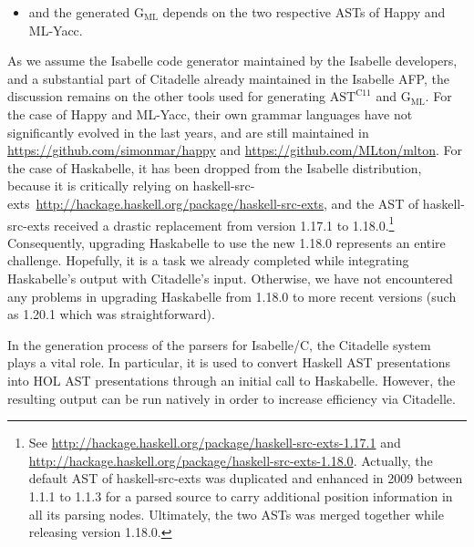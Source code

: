 \begin{isabellebody}
\begin{isamarkuptext}
\begin{itemize}
\item and the generated $\text{G}_{\text{ML}}$ depends on the two respective ASTs of Happy and
ML-Yacc.%
\end{itemize}%
\end{isamarkuptext}\isamarkuptrue%
%
\begin{isamarkuptext}%
As we assume the Isabelle code generator maintained by the Isabelle developers, and a
substantial part of Citadelle already maintained in the Isabelle AFP, the discussion remains on the
other tools used for generating $\text{AST}^{\text{C11}}$ and $\text{G}_{\text{ML}}$. For the case
of Happy and ML-Yacc, their own grammar languages have not significantly evolved in the last years,
and are still maintained in \url{https://github.com/simonmar/happy} and
\url{https://github.com/MLton/mlton}. For the case of Haskabelle, it has been
dropped from the Isabelle distribution, because it is critically relying on
haskell-src-exts~\url{http://hackage.haskell.org/package/haskell-src-exts}, and the
AST of haskell-src-exts received a drastic replacement from version 1.17.1 to 1.18.0.\footnote{See \url{http://hackage.haskell.org/package/haskell-src-exts-1.17.1} and
  \url{http://hackage.haskell.org/package/haskell-src-exts-1.18.0}. Actually, the
  default AST of haskell-src-exts was duplicated and enhanced in 2009 between 1.1.1 to 1.1.3 for a
  parsed source to carry additional position information in all its parsing nodes. Ultimately, the
  two ASTs was merged together while releasing version 1.18.0.} Consequently, upgrading
Haskabelle to use the new 1.18.0 represents an entire challenge. Hopefully, it is a task we already
completed while integrating Haskabelle's output with Citadelle's input. Otherwise, we have not
encountered any problems in upgrading Haskabelle from 1.18.0 to more recent versions (such as 1.20.1
which was straightforward).%
\end{isamarkuptext}\isamarkuptrue%
%
\isadelimdocument
%
\endisadelimdocument
%
\isatagdocument
%
\isamarkuptrue%
%
\endisatagdocument
{\isafolddocument}%
%
\isadelimdocument
%
\endisadelimdocument
%
\begin{isamarkuptext}%
In the generation process of the parsers for Isabelle/C, the Citadelle 
system~\cite{DBLP:journals/afp/TuongW15} plays a vital role. In particular, it is used to 
convert Haskell AST presentations into HOL AST presentations through an initial call to 
Haskabelle. However, the resulting output can be run natively in order to increase efficiency
via Citadelle. 


\end{isamarkuptext}
\end{isabellebody}
